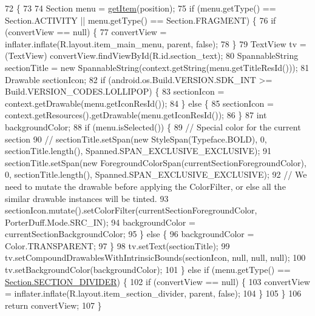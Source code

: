 \begin{DoxyCode}
72                                                                           \{
73 
74         Section menu = \hyperlink{classorg_1_1buildmlearn_1_1toolkit_1_1adapter_1_1NavigationDrawerMenuAdapter_a5a1da2dcdb45463a2e24f39f4dc111b9}{getItem}(position);
75         \textcolor{keywordflow}{if} (menu.getType() == Section.ACTIVITY || menu.getType() == Section.FRAGMENT) \{
76             \textcolor{keywordflow}{if} (convertView == null) \{
77                 convertView = inflater.inflate(R.layout.item\_main\_menu, parent, \textcolor{keyword}{false});
78             \}
79             TextView tv = (TextView) convertView.findViewById(R.id.section\_text);
80             SpannableString sectionTitle = \textcolor{keyword}{new} SpannableString(context.getString(menu.getTitleResId()));
81             Drawable sectionIcon;
82             \textcolor{keywordflow}{if} (android.os.Build.VERSION.SDK\_INT >= Build.VERSION\_CODES.LOLLIPOP) \{
83                 sectionIcon = context.getDrawable(menu.getIconResId());
84             \} \textcolor{keywordflow}{else} \{
85                 sectionIcon = context.getResources().getDrawable(menu.getIconResId());
86             \}
87             \textcolor{keywordtype}{int} backgroundColor;
88             \textcolor{keywordflow}{if} (menu.isSelected()) \{
89                 \textcolor{comment}{// Special color for the current section}
90 \textcolor{comment}{//            sectionTitle.setSpan(new StyleSpan(Typeface.BOLD), 0, sectionTitle.length(),
       Spanned.SPAN\_EXCLUSIVE\_EXCLUSIVE);}
91                 sectionTitle.setSpan(\textcolor{keyword}{new} ForegroundColorSpan(currentSectionForegroundColor), 0, 
      sectionTitle.length(), Spanned.SPAN\_EXCLUSIVE\_EXCLUSIVE);
92                 \textcolor{comment}{// We need to mutate the drawable before applying the ColorFilter, or else all the similar
       drawable instances will be tinted.}
93                 sectionIcon.mutate().setColorFilter(currentSectionForegroundColor, PorterDuff.Mode.SRC\_IN);
94                 backgroundColor = currentSectionBackgroundColor;
95             \} \textcolor{keywordflow}{else} \{
96                 backgroundColor = Color.TRANSPARENT;
97             \}
98             tv.setText(sectionTitle);
99             tv.setCompoundDrawablesWithIntrinsicBounds(sectionIcon, null, null, null);
100             tv.setBackgroundColor(backgroundColor);
101         \} \textcolor{keywordflow}{else} \textcolor{keywordflow}{if} (menu.getType() == \hyperlink{enumorg_1_1buildmlearn_1_1toolkit_1_1model_1_1Section_acc0a57a45c96711214e40f17b5b3cfe0}{Section.SECTION\_DIVIDER}) \{
102             \textcolor{keywordflow}{if} (convertView == null) \{
103                 convertView = inflater.inflate(R.layout.item\_section\_divider, parent, \textcolor{keyword}{false});
104             \}
105         \}
106         \textcolor{keywordflow}{return} convertView;
107     \}
\end{DoxyCode}


